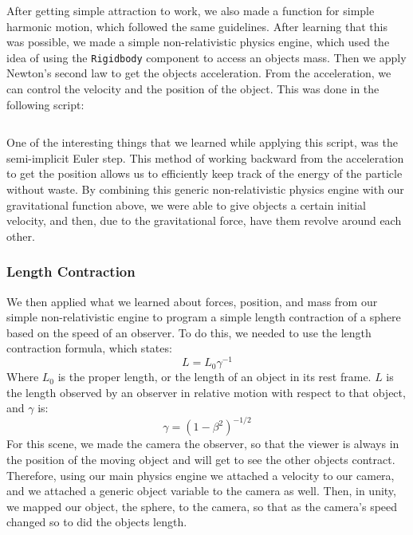 \documentclass[12pt]{article}
\begin{document}
After getting simple attraction to work, we also made a function for simple harmonic motion, which followed the same guidelines. After learning that this was possible, we made a simple non-relativistic physics engine, which used the idea of using the \texttt{Rigidbody} component to access an objects mass. Then we apply Newton's second law to get the objects acceleration. From the acceleration, we can control the velocity and the position of the object. This was done in the following script: 
\inputminted[firstline=29,lastline=55,linenos,fontsize=\footnotesize,bgcolor=codebg]{csharp}{../unity/Assets/Scripts/Engine/MainEngine.cs}
One of the interesting things that we learned while applying this script, was the semi-implicit Euler step. This method of working backward from the acceleration to get the position allows us to efficiently keep track of the energy of the particle without waste. By combining this generic non-relativistic physics engine with our gravitational function above, we were able to give objects a certain initial velocity, and then, due to the gravitational force, have them revolve around each other. 

\subsubsection{Length Contraction}
We then applied what we learned about forces, position, and mass from our simple non-relativistic engine to program a simple length contraction of a sphere based on the speed of an observer. To do this, we needed to use the length contraction formula, which states:
\begin{equation}
L = L_0\gamma^{-1}
\end{equation}
Where $L_0$ is the proper length, or the length of an object in its rest frame. $L$ is the length observed by an observer in relative motion with respect to that object, and $\gamma$ is:
\begin{equation}
\gamma = (1-\beta^2)^{-1/2}
\end{equation}
For this scene, we made the camera the observer, so that the viewer is always in the position of the moving object and will get to see the other objects contract. Therefore, using our main physics engine we attached a velocity to our camera, and we attached a generic object variable to the camera as well. Then, in unity, we mapped our object, the sphere, to the camera, so that as the camera's speed changed so to did the objects length.

\inputminted[firstline=2,lastline=10,linenos,fontsize=\footnotesize,bgcolor=codebg]{csharp}{../unity/Assets/Scripts/CameraFollow.cs}
\end{document}
